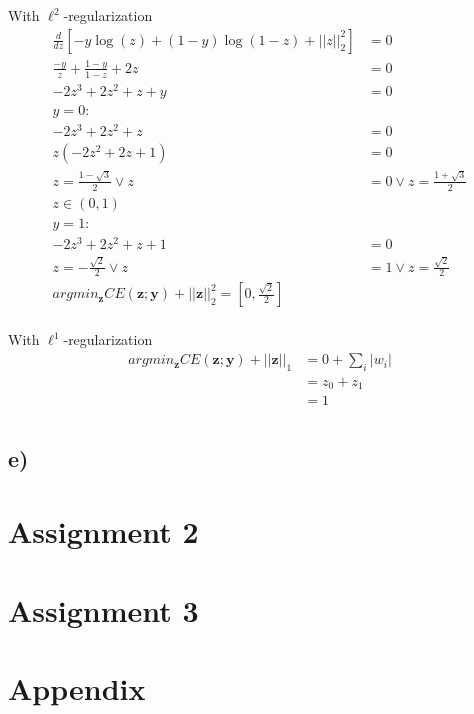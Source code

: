 \documentclass{article}
\begin{document}
With $\ell^2$-regularization
\begin{equation}
    \begin{split}
        \frac{d}{dz}\left[-y\log(z)+(1-y)\log(1-z)+||z||_2^2\right] &= 0\\
        \frac{-y}{z}+\frac{1-y}{1-z}+2z &= 0\\
        -2z^3+2z^2+z+y &=0\\
        y=0:\quad\quad\quad\quad\quad\quad\quad\quad\quad\quad\quad\quad\quad\quad\quad&\\
        -2z^3+2z^2+z &=0\\
        z(-2z^2+2z+1) &= 0\\
        z = \frac{1-\sqrt{3}}{2} \vee z &= 0 \vee z = \frac{1+\sqrt{3}}{2}\\  
        z\in\left(0,1\right)\\
        y=1:\quad\quad\quad\quad\quad\quad\quad\quad\quad\quad\quad\quad\quad\quad\quad&\\
        -2z^3+2z^2+z+1 &=0\\
        z = -\frac{\sqrt{2}}{2} \vee z &= 1 \vee z = \frac{\sqrt{2}}{2}\\ 
        argmin_\mathbf{z} CE(\mathbf{z}; \mathbf{y}) + ||\mathbf{z}||^2_2 = \left[0,\frac{\sqrt{2}}{2}\right]\\
    \end{split}
\end{equation}

With $\ell^1$-regularization
\begin{equation}
    \begin{split}
        argmin_\mathbf{z} CE(\mathbf{z}; \mathbf{y}) + ||\mathbf{z}||_1 &= 0 + \sum_i |w_i|\\
                                                                        &= z_0 + z_1\\
                                                                        &= 1\\
    \end{split}
\end{equation}

\subsection*{e)}

\section{Assignment 2}
\section{Assignment 3}

\section{Appendix} 
%     
\end{document}

